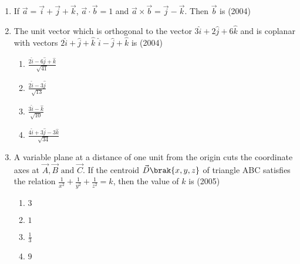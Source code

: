 \begin{enumerate}[label=\thesubsection.\arabic*.,ref=\thesubsection.\theenumi]
\begin{enumerate}
\end{enumerate}
\item If $\vec{a}=\vec{i}+\vec{j}+\vec{k}$, $\vec{a} \cdot \vec{b}=1$ and $\vec{a} \times \vec{b} = \vec{j} - \vec{k}$. Then $\vec{b}$ is 
\hfill (2004)
\begin{enumerate}
\end{enumerate}
    \item The unit vector which is orthogonal to the vector $3\hat{i} + 2\hat{j} + 6\hat{k}$ and is coplanar with vectors $2\hat{i} + \hat{j} + \hat{k}$  $\hat{i} - \hat{j} + \hat{k}$ is 
    \hfill{(2004)}
    \begin{multicols}{4}
    	\begin{enumerate}[itemsep=1ex]
    		\item $\frac{2\hat{i} - 6\hat{j} + \hat{k}}{\sqrt{41}}$
    		\item $\frac{2\hat{i} - 3\hat{j}}{\sqrt{13}}$
    		\item $\frac{3\hat{i} - \hat{k}}{\sqrt{10}}$
    		\item $\frac{4\hat{i} + 3\hat{j} - 3\hat{k}}{\sqrt{34}}$
    	\end{enumerate}
    \end{multicols}
    \item A variable plane at a distance of one unit from the origin cuts the coordinate axes at $\vec{A}, \vec{B} \text{ and } \vec{C}$. If the centroid $\vec{D} \brak{x,y,z}$ of triangle ABC satisfies the relation $\frac{1}{x^{2}} + \frac{1}{y^{2}} + \frac{1}{z^{2}} = k$, then the value of $k$ is
    \hfill{(2005)}
    \begin{multicols}{4}
    	\begin{enumerate}
    		\item $3$
    		\item $1$
    		\item $\frac{1}{3}$
    		\item $9$

\end{enumerate}
\end{multicols}
\end{enumerate}
